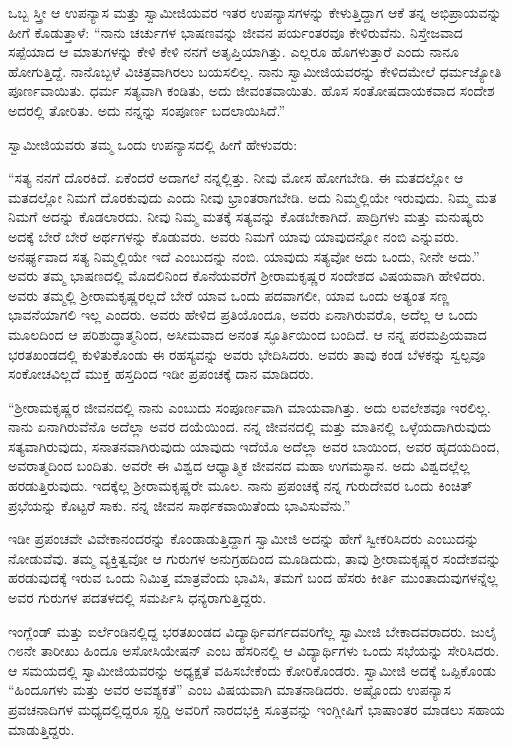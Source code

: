  ಒಬ್ಬ ಸ್ತ್ರೀ ಆ ಉಪನ್ಯಾಸ ಮತ್ತು ಸ್ವಾಮೀಜಿಯವರ ಇತರ ಉಪನ್ಯಾಸಗಳನ್ನು ಕೇಳುತ್ತಿದ್ದಾಗ ಆಕೆ ತನ್ನ ಅಭಿಪ್ರಾಯವನ್ನು ಹೀಗೆ ಕೊಡುತ್ತಾಳೆ: “ನಾನು ಚರ್ಚುಗಳ ಭಾಷಣವನ್ನು ಜೀವನ ಪರ್ಯಂತರವೂ ಕೇಳಿರುವೆನು. ನಿಸ್ತೇಜವಾದ ಸಪ್ಪೆಯಾದ ಆ ಮಾತುಗಳನ್ನು ಕೇಳಿ ಕೇಳಿ ನನಗೆ ಅತೃಪ್ತಿಯಾಗಿತ್ತು. ಎಲ್ಲರೂ ಹೊಗಳುತ್ತಾರೆ ಎಂದು ನಾನೂ ಹೋಗುತ್ತಿದ್ದೆ. ನಾನೊಬ್ಬಳೆ ವಿಚಿತ್ರವಾಗಿರಲು ಬಯಸಲಿಲ್ಲ. ನಾನು ಸ್ವಾಮೀಜಿಯವರನ್ನು ಕೇಳಿದಮೇಲೆ ಧರ್ಮಜ್ಯೋತಿ ಪೂರ್ಣವಾಯಿತು. ಧರ್ಮ ಸತ್ಯವಾಗಿ ಕಂಡಿತು, ಅದು ಜೀವಂತವಾಯಿತು. ಹೊಸ ಸಂತೋಷದಾಯಕವಾದ ಸಂದೇಶ ಅದರಲ್ಲಿ ತೋರಿತು. ಅದು ನನ್ನನ್ನು ಸಂಪೂರ್ಣ ಬದಲಾಯಿಸಿದೆ.” 

 ಸ್ವಾಮೀಜಿಯವರು ತಮ್ಮ ಒಂದು ಉಪನ್ಯಾಸದಲ್ಲಿ ಹೀಗೆ ಹೇಳುವರು: 

 “ಸತ್ಯ ನನಗೆ ದೊರಕಿದೆ. ಏಕೆಂದರೆ ಅದಾಗಲೆ ನನ್ನಲ್ಲಿತ್ತು. ನೀವು ಮೋಸ ಹೋಗಬೇಡಿ. ಈ ಮತದಲ್ಲೋ ಆ ಮತದಲ್ಲೋ ನಿಮಗೆ ದೊರಕುವುದು ಎಂದು ನೀವು ಭ್ರಾಂತರಾಗಬೇಡಿ. ಅದು ನಿಮ್ಮಲ್ಲಿಯೇ ಇರುವುದು. ನಿಮ್ಮ ಮತ ನಿಮಗೆ ಅದನ್ನು ಕೊಡಲಾರದು. ನೀವು ನಿಮ್ಮ ಮತಕ್ಕೆ ಸತ್ಯವನ್ನು ಕೊಡಬೇಕಾಗಿದೆ. ಪಾದ್ರಿಗಳು ಮತ್ತು ಮನುಷ್ಯರು ಅದಕ್ಕೆ ಬೇರೆ ಬೇರೆ ಅರ್ಥಗಳನ್ನು ಕೊಡುವರು. ಅವರು ನಿಮಗೆ ಯಾವು ಯಾವುದನ್ನೋ ನಂಬಿ ಎನ್ನುವರು. ಅನರ್ಘ್ಯವಾದ ಸತ್ಯ ನಿಮ್ಮಲ್ಲಿಯೇ ಇದೆ ಎಂಬುದನ್ನು ನಂಬಿ. ಯಾವುದು ಸತ್ಯವೋ ಅದು ಒಂದು, ನೀನೇ ಅದು.” ಅವರು ತಮ್ಮ ಭಾಷಣದಲ್ಲಿ ಮೊದಲಿನಿಂದ ಕೊನೆಯವರೆಗೆ ಶ‍್ರೀರಾಮಕೃಷ್ಣರ ಸಂದೇಶದ ವಿಷಯವಾಗಿ ಹೇಳಿದರು. ಅವರು ತಮ್ಮಲ್ಲಿ ಶ‍್ರೀರಾಮಕೃಷ್ಣರಲ್ಲದೆ ಬೇರೆ ಯಾವ ಒಂದು ಪದವಾಗಲೀ, ಯಾವ ಒಂದು ಅತ್ಯಂತ ಸಣ್ಣ ಭಾವನೆಯಾಗಲಿ ಇಲ್ಲ ಎಂದರು. ಅವರು ಹೇಳಿದ ಪ್ರತಿಯೊಂದೂ, ಅವರು ಏನಾಗಿರುವರೊ, ಅದೆಲ್ಲ ಆ ಒಂದು ಮೂಲದಿಂದ ಆ ಪರಿಶುದ್ಧಾತ್ಮನಿಂದ, ಅಸೀಮವಾದ ಅನಂತ ಸ್ಫೂರ್ತಿಯಿಂದ ಬಂದಿದೆ. ಆ ನನ್ನ ಪರಮಪ್ರಿಯವಾದ ಭರತಖಂಡದಲ್ಲಿ ಕುಳಿತುಕೊಂಡು ಈ ರಹಸ್ಯವನ್ನು ಅವರು ಭೇದಿಸಿದರು. ಅವರು ತಾವು ಕಂಡ ಬೆಳಕನ್ನು ಸ್ವಲ್ಪವೂ ಸಂಕೋಚವಿಲ್ಲದೆ ಮುಕ್ತ ಹಸ್ತದಿಂದ ಇಡೀ ಪ್ರಪಂಚಕ್ಕೆ ದಾನ ಮಾಡಿದರು. 

 “ಶ‍್ರೀರಾಮಕೃಷ್ಣರ ಜೀವನದಲ್ಲಿ ನಾನು ಎಂಬುದು ಸಂಪೂರ್ಣವಾಗಿ ಮಾಯವಾಗಿತ್ತು. ಅದು ಲವಲೇಶವೂ ಇರಲಿಲ್ಲ. ನಾನು ಏನಾಗಿರುವೆನೊ ಅದೆಲ್ಲಾ ಅವರ ದಯೆಯಿಂದ. ನನ್ನ ಜೀವನದಲ್ಲಿ ಮತ್ತು ಮಾತಿನಲ್ಲಿ ಒಳ್ಳೆಯದಾಗಿರುವುದು ಸತ್ಯವಾಗಿರುವುದು, ಸನಾತನವಾಗಿರುವುದು ಯಾವುದು ಇದೆಯೊ ಅದೆಲ್ಲಾ ಅವರ ಬಾಯಿಂದ, ಅವರ ಹೃದಯದಿಂದ, ಅವರಾತ್ಮದಿಂದ ಬಂದಿತು. ಅವರೇ ಈ ವಿಶ್ವದ ಆಧ್ಯಾತ್ಮಿಕ ಜೀವನದ ಮಹಾ ಉಗಮಸ್ಥಾನ. ಅದು ವಿಶ್ವದಲ್ಲೆಲ್ಲ ಹರಡುತ್ತಿರುವುದು. ಇದಕ್ಕೆಲ್ಲ ಶ‍್ರೀರಾಮಕೃಷ್ಣರೇ ಮೂಲ. ನಾನು ಪ್ರಪಂಚಕ್ಕೆ ನನ್ನ ಗುರುದೇವರ ಒಂದು ಕಿಂಚಿತ್ ಪ್ರಭೆಯನ್ನು ಕೊಟ್ಟರೆ ಸಾಕು. ನನ್ನ ಜೀವನ ಸಾರ್ಥಕವಾಯಿತೆಂದು ಭಾವಿಸುವೆನು.” 

 ಇಡೀ ಪ್ರಪಂಚವೇ ವಿವೇಕಾನಂದರನ್ನು ಕೊಂಡಾಡುತ್ತಿದ್ದಾಗ ಸ್ವಾಮೀಜಿ ಅದನ್ನು ಹೇಗೆ ಸ್ವೀಕರಿಸಿದರು ಎಂಬುದನ್ನು ನೋಡುವೆವು. ತಮ್ಮ ವ್ಯಕ್ತಿತ್ವವೋ ಆ ಗುರುಗಳ ಅನುಗ್ರಹದಿಂದ ಮೂಡಿದುದು, ತಾವು ಶ‍್ರೀರಾಮಕೃಷ್ಣರ ಸಂದೇಶವನ್ನು ಹರಡುವುದಕ್ಕೆ ಇರುವ ಒಂದು ನಿಮಿತ್ತ ಮಾತ್ರವೆಂದು ಭಾವಿಸಿ, ತಮಗೆ ಬಂದ ಹೆಸರು ಕೀರ್ತಿ ಮುಂತಾದುವುಗಳನ್ನೆಲ್ಲ ಅವರ ಗುರುಗಳ ಪದತಳದಲ್ಲಿ ಸಮರ್ಪಿಸಿ ಧನ್ಯರಾಗುತ್ತಿದ್ದರು. 

 ಇಂಗ್ಲೆಂಡ್ ಮತ್ತು ಐರ್ಲೆಂಡಿನಲ್ಲಿದ್ದ ಭರತಖಂಡದ ವಿದ್ಯಾರ್ಥಿವರ್ಗದವರಿಗೆಲ್ಲ ಸ್ವಾಮೀಜಿ ಬೇಕಾದವರಾದರು. ಜುಲೈ ೧೮ನೇ ತಾರೀಖು ಹಿಂದೂ ಅಸೋಸಿಯೇಷನ್ ಎಂಬ ಹೆಸರಿನಲ್ಲಿ ಆ ವಿದ್ಯಾರ್ಥಿಗಳು ಒಂದು ಸಭೆಯನ್ನು ಸೇರಿಸಿದರು. ಆ ಸಮಯದಲ್ಲಿ ಸ್ವಾಮೀಜಿಯವರನ್ನು ಅಧ್ಯಕ್ಷತೆ ವಹಿಸಬೇಕೆಂದು ಕೋರಿಕೊಂಡರು. ಸ್ವಾಮೀಜಿ ಅದಕ್ಕೆ ಒಪ್ಪಿಕೊಂಡು “ಹಿಂದೂಗಳು ಮತ್ತು ಅವರ ಅವಶ್ಯಕತೆ” ಎಂಬ ವಿಷಯವಾಗಿ ಮಾತನಾಡಿದರು. ಅಷ್ಟೊಂದು ಉಪನ್ಯಾಸ ಪ್ರವಚನಾದಿಗಳ ಮಧ್ಯದಲ್ಲಿದ್ದರೂ ಸ್ಟರ‍್ಡಿ ಅವರಿಗೆ ನಾರದಭಕ್ತಿ ಸೂತ್ರವನ್ನು ಇಂಗ್ಲೀಷಿಗೆ ಭಾಷಾಂತರ ಮಾಡಲು ಸಹಾಯ ಮಾಡುತ್ತಿದ್ದರು. 

